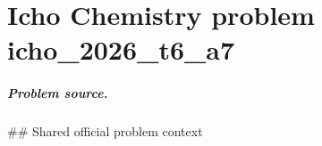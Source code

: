 
\chapter{Icho Chemistry problem icho\_2026\_t6\_a7}
\label{ch:IChO2026Problems_problem_icho_2026_t6_a7}

\paragraph{Problem source.}
\#\# Shared official problem context
